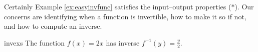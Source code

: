 Certainly Example \ref{ex:easyinvfunc} satisfies the input--output properties ($\ast$). Our concerns are identifying when a function is invertible, how to make it so if not, and how to compute an inverse. %



\begin{examples}{}{invexs}
	\exstart The function $f(x)=2x$ has inverse $f^{-1}(y)=\frac y2$.
	

\end{examples}

